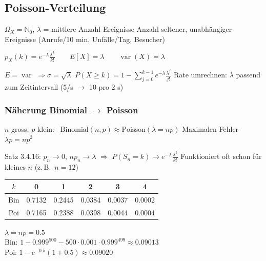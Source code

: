 \subsection{Poisson-Verteilung}
\begin{merke}
\begin{itemize}
\pfeil $\Omega_X=\mathbb N_0$, $\lambda$ = mittlere Anzahl Ereignisse
\pfeil Anzahl seltener, unabhängiger Ereignisse (Anrufe/10 min, Unfälle/Tag, Besucher)
\end{itemize}
\end{merke}
\begin{formel}
$\displaystyle p_X(k)=e^{-\lambda}\frac{\lambda^k}{k!}\qquad
E[X]=\lambda\qquad \operatorname{var}(X)=\lambda$
\end{formel}
\begin{itemize}
\pfeil $E=\operatorname{var}$ $\Rightarrow\sigma=\sqrt\lambda$
\pfeil $P(X\ge k)=1-\sum_{j=0}^{k-1}e^{-\lambda}\frac{\lambda^j}{j!}$
\pfeil Rate umrechnen: $\lambda$ passend zum Zeitintervall (5/s $\to$ 10 pro 2 s)
\end{itemize}

\subsubsection*{Näherung Binomial $\to$ Poisson}
\begin{formel}
$n$ gross, $p$ klein: \ $\mathrm{Binomial}(n,p)\approx\mathrm{Poisson}(\lambda=np)$ Maximalen Fehler $\lambda p = n p^2$
\end{formel}
\begin{itemize}
\pfeil Satz 3.4.16: $p_n\to0$, $np_n\to\lambda$ $\Rightarrow$ $P(S_n=k)\to e^{-\lambda}\frac{\lambda^k}{k!}$
\pfeil Funktioniert oft schon für kleines $n$ (z.\,B.\ $n=12$)
\end{itemize}
\begin{bsp}
\begin{tabular}{@{}c|ccccc@{}}
$k$&0&1&2&3&4\\\midrule
Bin&0.7132&0.2445&0.0384&0.0037&0.0002\\
Poi&0.7165&0.2388&0.0398&0.0044&0.0004
\end{tabular}
\end{bsp}
\begin{bsp}[{{Aufg.\ 3.4.18: $p=0.001$, 500 Teile, $\ge2$ fehlerhaft}}]
$\lambda=np=0.5$\\
Bin: $1-0.999^{500}-500\cdot0.001\cdot0.999^{499}\approx0.09013$\\
Poi: $1-e^{-0.5}(1+0.5)\approx0.09020$
\end{bsp}

